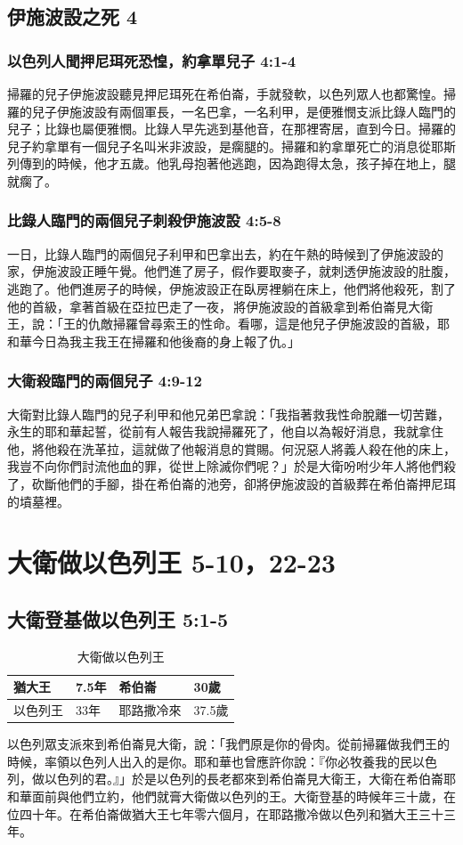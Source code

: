 \subsection{伊施波設之死 4}
\subsubsection{以色列人聞押尼珥死恐惶，約拿單兒子 4:1-4}
掃羅的兒子伊施波設聽見押尼珥死在希伯崙，手就發軟，以色列眾人也都驚惶。掃羅的兒子伊施波設有兩個軍長，一名巴拿，一名利甲，是便雅憫支派比錄人臨門的兒子；比錄也屬便雅憫。比錄人早先逃到基他音，在那裡寄居，直到今日。掃羅的兒子約拿單有一個兒子名叫米非波設，是瘸腿的。掃羅和約拿單死亡的消息從耶斯列傳到的時候，他才五歲。他乳母抱著他逃跑，因為跑得太急，孩子掉在地上，腿就瘸了。

\subsubsection{比錄人臨門的兩個兒子刺殺伊施波設 4:5-8}
一日，比錄人臨門的兩個兒子利甲和巴拿出去，約在午熱的時候到了伊施波設的家，伊施波設正睡午覺。他們進了房子，假作要取麥子，就刺透伊施波設的肚腹，逃跑了。他們進房子的時候，伊施波設正在臥房裡躺在床上，他們將他殺死，割了他的首級，拿著首級在亞拉巴走了一夜， 將伊施波設的首級拿到希伯崙見大衛王，說：「王的仇敵掃羅曾尋索王的性命。看哪，這是他兒子伊施波設的首級，耶和華今日為我主我王在掃羅和他後裔的身上報了仇。」

\subsubsection{大衛殺臨門的兩個兒子 4:9-12}
大衛對比錄人臨門的兒子利甲和他兄弟巴拿說：「我指著救我性命脫離一切苦難，永生的耶和華起誓，從前有人報告我說掃羅死了，他自以為報好消息，我就拿住他，將他殺在洗革拉，這就做了他報消息的賞賜。何況惡人將義人殺在他的床上，我豈不向你們討流他血的罪，從世上除滅你們呢？」於是大衛吩咐少年人將他們殺了，砍斷他們的手腳，掛在希伯崙的池旁，卻將伊施波設的首級葬在希伯崙押尼珥的墳墓裡。

\section{大衛做以色列王 5-10，22-23}
\subsection{大衛登基做以色列王 5:1-5}
\begin{table}
\centering 
\begin{tabular}{p{1.5cm}|p{}|p{1.8cm}|p{1.25cm}}\hline\hline
猶大王&7.5年 & 希伯崙&30歲\\\hline
以色列王&33年&耶路撒冷來&37.5歲\\\hline
\end{tabular}
\caption{大衛做以色列王}
\end{table}
以色列眾支派來到希伯崙見大衛，說：「我們原是你的骨肉。從前掃羅做我們王的時候，率領以色列人出入的是你。耶和華也曾應許你說：『你必牧養我的民以色列，做以色列的君。』」於是以色列的長老都來到希伯崙見大衛王，大衛在希伯崙耶和華面前與他們立約，他們就膏大衛做以色列的王。大衛登基的時候年三十歲，在位四十年。在希伯崙做猶大王七年零六個月，在耶路撒冷做以色列和猶大王三十三年。

